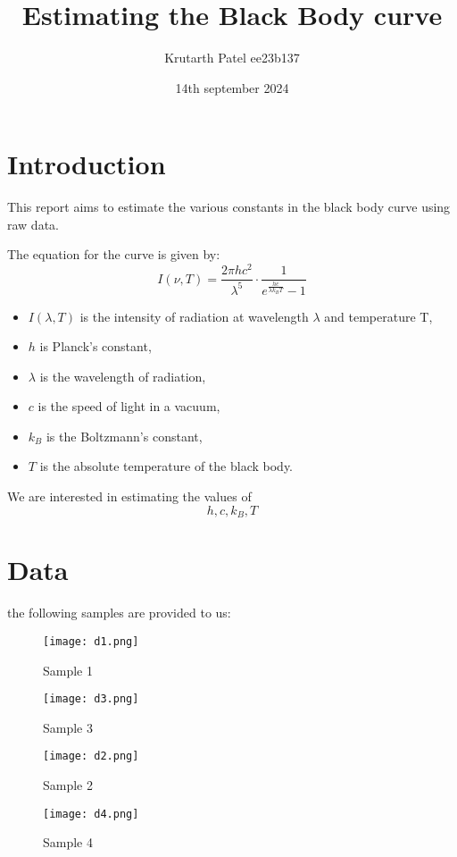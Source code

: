 \documentclass{report}
\title{Estimating the Black Body curve}
\author{Krutarth Patel ee23b137}
\date{14th september 2024}
\begin{document}
\maketitle

\section*{Introduction}
This report aims to estimate the various constants in the black 
body curve using raw data.

The equation for the curve is given by:
\[I(\nu, T) = \frac{2 \pi h c^2}{\lambda^5} \cdot \frac{1}{e^{\frac{h c}{\lambda k_B T}} - 1}\]
\begin{itemize}
	\item $I(\lambda ,T)$ is the intensity of radiation at wavelength $\lambda$ and temperature T,
	\item $h$ is Planck's constant,
	\item $\lambda$ is the wavelength of radiation,
	\item $c$ is the speed of light in a vacuum,
	\item $k_B$ is the Boltzmann's constant,
	\item $T$ is the absolute temperature of the black body.
\end{itemize}

We are interested in estimating the values of \[h, c, k_B, T\]

\section*{Data}
the following samples are provided to us: 
\begin{figure}[htp]
	\centering
	\texttt{[image: d1.png]}
    \caption{Sample 1}
\end{figure}
\begin{figure}[htp]
	\centering
	\texttt{[image: d3.png]}
    \caption{Sample 3}
\end{figure}
\begin{figure}[htp]
	\centering
	\texttt{[image: d2.png]}
    \caption{Sample 2}
\end{figure}
\begin{figure}[htp]
	\centering
	\texttt{[image: d4.png]}
    \caption{Sample 4}
\end{figure}
\end{document}
